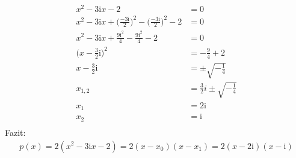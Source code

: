 \begin{align*}
x^2-3\mathrm{i}x-2&=0\\
x^2-3\mathrm{i}x+\bigg(\frac{-3\mathrm{i}}{2}\bigg)^2-\bigg(\frac{-3\mathrm{i}}{2}\bigg)^2-2&=0\\
x^2-3\mathrm{i}x+\frac{9\mathrm{i}^2}{4}-\frac{9\mathrm{i}^2}{4}-2&=0\\
\bigg(x-\frac{3}{2}\mathrm{i}\bigg)^2&=-\frac{9}{4}+2\\
x-\frac{3}{2}\mathrm{i}&=\pm\sqrt{-\frac{1}{4}}\\
x_{1,2}&=\frac{3}{2}i\pm\sqrt{-\frac{1}{4}}\\
x_1&=2\mathrm{i}\\
x_2&=\mathrm{i}\\
\end{align*}
Fazit:\\
\begin{align*}
p(x)=2(x^2-3\mathrm{i}x-2)=2(x-x_0)(x-x_1)=2(x-2\mathrm{i})(x-\mathrm{i}) 
\end{align*}
